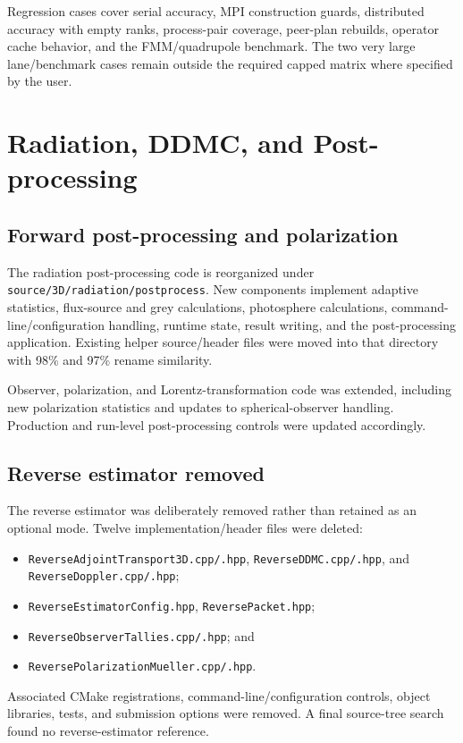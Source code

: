 \documentclass[10pt,a4paper]{article}
\newcommand{\file}[1]{\nolinkurl{#1}}
\begin{document}
Regression cases cover serial accuracy, MPI construction guards, distributed
accuracy with empty ranks, process-pair coverage, peer-plan rebuilds, operator
cache behavior, and the FMM/quadrupole benchmark.  The two very large
lane/benchmark cases remain outside the required capped matrix where specified
by the user.

\section{Radiation, DDMC, and Post-processing}

\subsection{Forward post-processing and polarization}

The radiation post-processing code is reorganized under
\file{source/3D/radiation/postprocess}.  New components implement adaptive
statistics, flux-source and grey calculations, photosphere calculations,
command-line/configuration handling, runtime state, result writing, and the
post-processing application.  Existing helper source/header files were moved
into that directory with 98\% and 97\% rename similarity.

Observer, polarization, and Lorentz-transformation code was extended, including
new polarization statistics and updates to spherical-observer handling.
Production and run-level post-processing controls were updated accordingly.

\subsection{Reverse estimator removed}

The reverse estimator was deliberately removed rather than retained as an
optional mode.  Twelve implementation/header files were deleted:
\begin{itemize}
  \item \file{ReverseAdjointTransport3D.cpp/.hpp},
        \file{ReverseDDMC.cpp/.hpp}, and \file{ReverseDoppler.cpp/.hpp};
  \item \file{ReverseEstimatorConfig.hpp}, \file{ReversePacket.hpp};
  \item \file{ReverseObserverTallies.cpp/.hpp}; and
  \item \file{ReversePolarizationMueller.cpp/.hpp}.
\end{itemize}
Associated CMake registrations, command-line/configuration controls, object
libraries, tests, and submission options were removed.  A final source-tree
search found no reverse-estimator reference.
\end{document}

